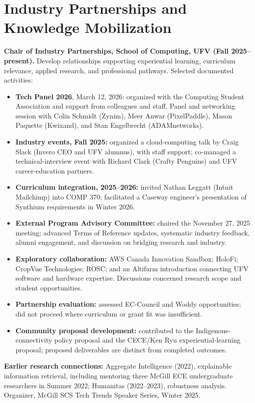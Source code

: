 \documentclass[10pt,letterpaper]{article}
\begin{document}
\section{Industry Partnerships and Knowledge Mobilization}
\textbf{Chair of Industry Partnerships, School of Computing, UFV (Fall 2025--present).}
Develop relationships supporting experiential learning, curriculum relevance, applied research, and professional pathways. Selected documented activities:
\begin{itemize}
\item \textbf{Tech Panel 2026}, March 12, 2026: organized with the Computing Student Association and support from colleagues and staff. Panel and networking session with Colin Schmidt (Zynim), Meer Anwar (PixelPaddle), Mason Paquette (Kwixand), and Stan Engelbrecht (ADAMnetworks).
\item \textbf{Industry events, Fall 2025:} organized a cloud-computing talk by Craig Slack (Invero CEO and UFV alumnus), with staff support; co-managed a technical-interview event with Richard Clark (Crafty Penguins) and UFV career-education partners.
\item \textbf{Curriculum integration, 2025--2026:} invited Nathan Leggatt (Intuit Mailchimp) into COMP 370; facilitated a Caseway engineer's presentation of Synthium requirements in Winter 2026.
\item \textbf{External Program Advisory Committee:} chaired the November 27, 2025 meeting; advanced Terms of Reference updates, systematic industry feedback, alumni engagement, and discussion on bridging research and industry.
\item \textbf{Exploratory collaboration:} AWS Canada Innovation Sandbox; HoloFi; CropVue Technologies; ROSC; and an Altifarm introduction connecting UFV software and hardware expertise. Discussions concerned research scope and student opportunities.
\item \textbf{Partnership evaluation:} assessed EC-Council and Woddy opportunities; did not proceed where curriculum or grant fit was insufficient.
\item \textbf{Community proposal development:} contributed to the Indigenous-connectivity policy proposal and the CECE/Ken Ryu experiential-learning proposal; proposed deliverables are distinct from completed outcomes.
\end{itemize}

\textbf{Earlier research connections:} Aggregate Intelligence (2022), explainable information retrieval, including mentoring three McGill ECE undergraduate researchers in Summer 2022; Humanitas (2022--2023), robustness analysis. Organizer, McGill SCS Tech Trends Speaker Series, Winter 2025.
\end{document}
